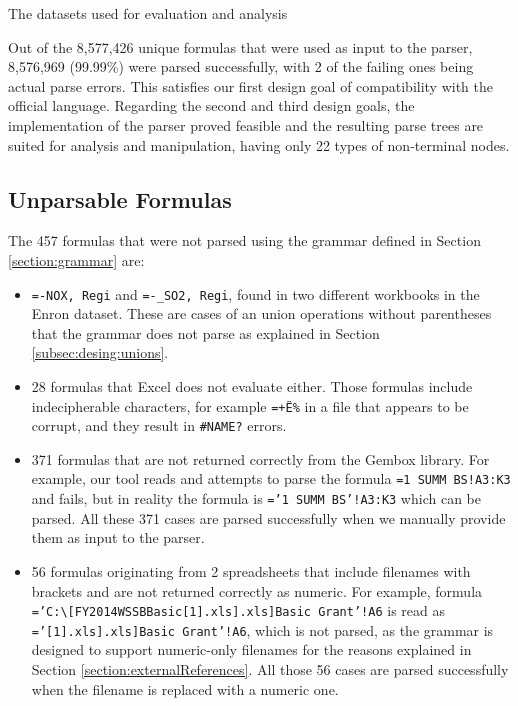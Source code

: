 \documentclass[times]{smrauth}
\begin{document}
\begin{table}[]
	\centering
	\caption{The datasets used for evaluation and analysis}
	\label{table:datasets}
	
\end{table}

Out of the 8,577,426 unique formulas that were used as input to the parser, 8,576,969 (99.99\%) were parsed successfully, with 2 of the failing ones being actual parse errors. This satisfies our first design goal of compatibility with the official language. Regarding the second and third design goals, the implementation of the parser proved feasible and the resulting parse trees are suited for analysis and manipulation, having only 22 types of non-terminal nodes.

\subsection{Unparsable Formulas}
\label{subsection:unparsableFormulas}
The 457 formulas that were not parsed using the grammar defined in Section \ref{section:grammar} are:

\begin{itemize}
	\item \texttt{=-NOX, Regi} and \texttt{=-_SO2, Regi}, found in two different workbooks in the Enron dataset. These are cases of an union operations without parentheses that the grammar does not parse as explained in Section \ref{subsec:desing:unions}.
	\item 28 formulas that Excel does not evaluate either. Those formulas include indecipherable characters, for example \texttt{=+Ë\%} in a file that appears to be corrupt, and they result in \texttt{\#NAME?} errors.
	\item 371 formulas that are not returned correctly from the Gembox library. For example, our tool reads and attempts to parse the formula \texttt{=1 SUMM BS!A3:K3} and fails, but in reality the formula is \texttt{='1 SUMM BS'!A3:K3} which can be parsed. All these 371 cases are parsed successfully when we manually provide them as input to the parser.
	\item 56 formulas originating from 2 spreadsheets that include filenames with brackets and are not returned correctly as numeric. For example, formula \texttt{='C:\textbackslash[FY2014WSSBBasic[1].xls].xls]Basic Grant'!A6} is read as \texttt{='[1].xls].xls]Basic Grant'!A6}, which is not parsed, as the grammar is designed to support numeric-only filenames for the reasons explained in Section \ref{section:externalReferences}. All those 56 cases are parsed successfully when the filename is replaced with a numeric one.
\end{itemize}
\end{document}
